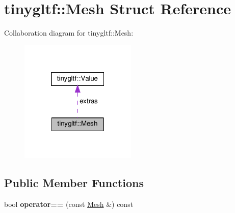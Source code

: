 \hypertarget{structtinygltf_1_1Mesh}{}\section{tinygltf\+:\+:Mesh Struct Reference}
\label{structtinygltf_1_1Mesh}


Collaboration diagram for tinygltf\+:\+:Mesh\+:\nopagebreak
\begin{figure}[H]
\begin{center}
\leavevmode
\includegraphics[width=157pt]{structtinygltf_1_1Mesh__coll__graph}
\end{center}
\end{figure}
\subsection*{Public Member Functions}
\begin{DoxyCompactItemize}
\item 
\mbox{\label{structtinygltf_1_1Mesh_a63f667490fbdf6e9c99158de83ef86f2}} 
bool {\bfseries operator==} (const \hyperlink{structtinygltf_1_1Mesh}{Mesh} \&) const
\end{DoxyCompactItemize}
